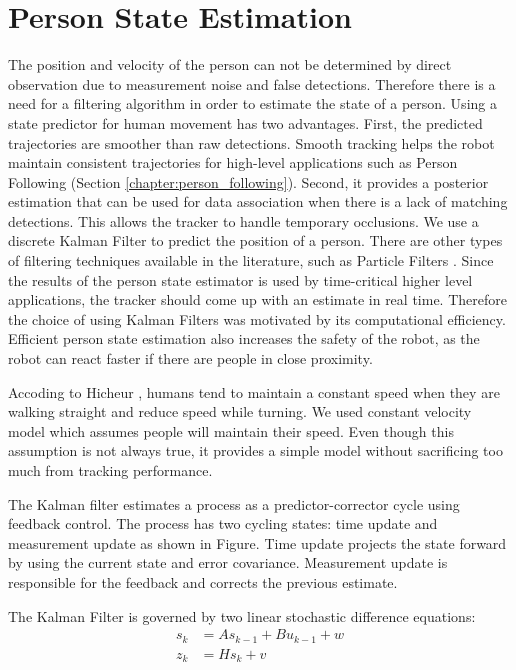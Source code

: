 \section{Person State Estimation}
\label{sec:multimodal_person_state_estimation}

The position and velocity of the person can not be determined by direct observation due to measurement noise and false detections. Therefore there is a need for a filtering algorithm in order to estimate the state of a person. Using a state predictor for human movement has two advantages. First, the predicted trajectories are smoother than raw detections. Smooth tracking helps the robot maintain consistent trajectories for high-level applications such as Person Following (Section \ref{chapter:person_following}). Second, it provides a posterior estimation that can be used for data association when there is a lack of matching detections. This allows the tracker to handle temporary occlusions. We use a discrete Kalman Filter \cite{kalman1960new} to predict the position of a person. There are other types of filtering techniques available in the literature, such as Particle Filters \cite{khan2004mcmc}. Since the results of the person state estimator is used by time-critical higher level applications, the tracker should come up with an estimate in real time. Therefore the choice of using Kalman Filters was motivated by its computational efficiency. Efficient person state estimation also increases the safety of the robot, as the robot can react faster if there are people in close proximity.

Accoding to Hicheur \cite{hicheur2005velocity}, humans tend to maintain a constant speed when they are walking straight and reduce speed while turning. We used constant velocity model which assumes people will maintain their speed. Even though this assumption is not always true, it provides a simple model without sacrificing too much from tracking performance.

The Kalman filter estimates a process as a predictor-corrector cycle using feedback control. The process has two cycling states: time update and measurement update as shown in Figure. Time update projects the state forward by using the current state and error covariance. Measurement update is responsible for the feedback and corrects the previous estimate.

The Kalman Filter is governed by two linear stochastic difference equations:
\begin{align}
s_k&=As_{k-1}+Bu_{k-1}+w \\
z_k&=Hs_k+v
\end{align}

